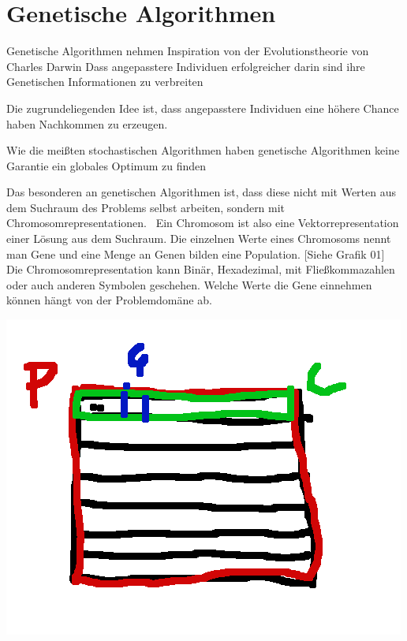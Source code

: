 \section{Genetische Algorithmen}

Genetische Algorithmen nehmen Inspiration von der Evolutionstheorie von Charles Darwin
Dass angepasstere Individuen erfolgreicher darin sind ihre Genetischen Informationen zu verbreiten

Die zugrundeliegenden Idee ist, dass angepasstere Individuen eine 
höhere Chance haben Nachkommen zu erzeugen. \cite*{GeneticAlgorithms}

Wie die meißten stochastischen Algorithmen haben genetische Algorithmen keine 
Garantie ein globales Optimum zu finden \cite*{GeneticAlgorithms}


Das besonderen an genetischen Algorithmen ist, dass diese nicht mit Werten aus dem
Suchraum des Problems selbst arbeiten, sondern mit Chromosomrepresentationen.~\cite*{TerminologiesAndOperators}
Ein Chromosom ist also eine Vektorrepresentation einer Lösung aus dem Suchraum.
Die einzelnen Werte eines Chromosoms nennt man Gene und eine Menge an Genen 
bilden eine Population. [Siehe Grafik 01]
Die Chromosomrepresentation kann Binär, Hexadezimal, mit Fließkommazahlen oder auch anderen Symbolen geschehen.
Welche Werte die Gene einnehmen können hängt von der Problemdomäne ab.

\includegraphics[scale=1.0]{images/Population_Chromosom_Gen.png}


